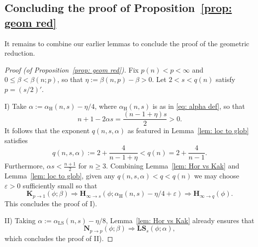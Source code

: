 \documentclass[reqno]{amsart}
\numberwithin{equation}{section}
\newcommand{\bH}{\mathbf{H}}
\newcommand{\bK}{\mathbf{K}}
\newcommand{\bN}{\mathbf{N}}
\newcommand{\bLS}{\mathbf{LS}}
\theoremstyle{plain}
\theoremstyle{definition}
\begin{document}



\subsection{Concluding the proof of Proposition~\ref{prop: geom red}} It remains to combine our earlier lemmas to conclude the proof of the geometric reduction. 

\begin{proof}[Proof (of Proposition~\ref{prop: geom red})]  Fix $p(n) < p < \infty$ and $0 \leq \beta < \beta(n; p)$, so that $\eta := \beta(n, p) - \beta >0$. Let $2 < s < q(n)$ satisfy $p = (s/2)'$.\medskip

\noindent I) Take $\alpha := \alpha_{\mathrm{H}}(n,s) - \eta/4$, where $\alpha_{\mathrm{H}}(n,s)$ is as in \eqref{eq: alpha def}, so that 
\begin{equation*}
    n + 1 - 2 \alpha s = \frac{(n-1+\eta)s}{2} > 0.
\end{equation*}
It follows that the exponent $q(n, s, \alpha)$ as featured in Lemma~\ref{lem: loc to glob} satisfies
\begin{equation*}
   q(n, s, \alpha) := 2 + \frac{4}{n - 1 + \eta} < q(n) = 2 + \frac{4}{n - 1}.
\end{equation*} 
Furthermore, $\alpha s < \frac{n+1}{2}$ for $n \geq 3$. Combining Lemma~\ref{lem: Hor vs Kak} and Lemma~\ref{lem: loc to glob}, given any $q(n, s, \alpha) < q < q(n)$ we may choose $\varepsilon > 0$ sufficiently small so that
\begin{equation*}
    \bK_{p \to 1}(\phi;  \beta) \Rightarrow \bH_{\infty \to s}(\phi; \alpha_{\mathrm{H}}(n, s) - \eta/4 + \varepsilon) \Rightarrow \bH_{\infty \to q}(\phi).
\end{equation*}
This concludes the proof of I). \medskip

\noindent II) Taking $\alpha := \alpha_{\mathrm{LS}}(n,s) - \eta/8$, Lemma~\ref{lem: Hor vs Kak} already ensures that
\begin{equation*}
     \bN_{p \to p}(\phi;  \beta) \Rightarrow \bLS_s(\phi; \alpha),
\end{equation*}
which concludes the proof of II).
\end{proof}
\end{document}

